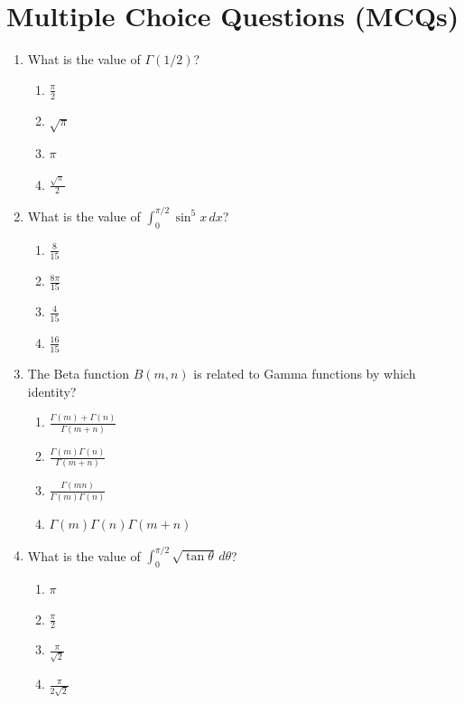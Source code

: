 \section{Multiple Choice Questions (MCQs)}

\begin{enumerate}[leftmargin=1.5em]
    \item What is the value of $\Gamma(1/2)$?
    \begin{enumerate}[label=(\alph*)]
        \item $\frac{\pi}{2}$
        \item $\sqrt{\pi}$
        \item $\pi$
        \item $\frac{\sqrt{\pi}}{2}$
    \end{enumerate}

    \item What is the value of $\int_0^{\pi/2} \sin^5 x\,dx$?
    \begin{enumerate}[label=(\alph*)]
        \item $\frac{8}{15}$
        \item $\frac{8\pi}{15}$
        \item $\frac{4}{15}$
        \item $\frac{16}{15}$
    \end{enumerate}

    \item The Beta function $B(m,n)$ is related to Gamma functions by which identity?
    \begin{enumerate}[label=(\alph*)]
        \item $\frac{\Gamma(m)+\Gamma(n)}{\Gamma(m+n)}$
        \item $\frac{\Gamma(m)\Gamma(n)}{\Gamma(m+n)}$
        \item $\frac{\Gamma(mn)}{\Gamma(m)\Gamma(n)}$
        \item $\Gamma(m)\Gamma(n)\Gamma(m+n)$
    \end{enumerate}

    \item What is the value of $\int_0^{\pi/2} \sqrt{\tan\theta}\,d\theta$?
    \begin{enumerate}[label=(\alph*)]
        \item $\pi$
        \item $\frac{\pi}{2}$
        \item $\frac{\pi}{\sqrt{2}}$
        \item $\frac{\pi}{2\sqrt{2}}$
    \end{enumerate}


\end{enumerate}
